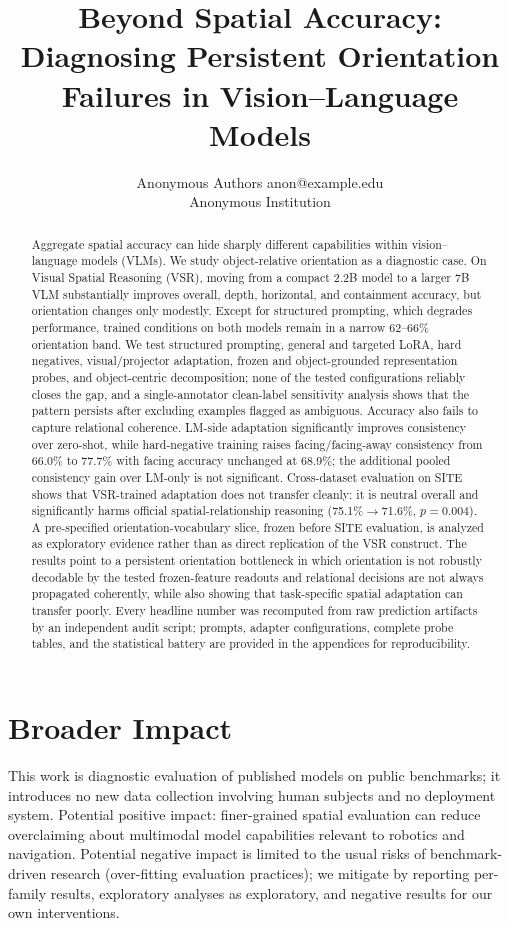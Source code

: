 \documentclass[10pt]{article}
\title{Beyond Spatial Accuracy: Diagnosing Persistent Orientation Failures in Vision--Language Models}
\author{\name Anonymous Authors \email anon@example.edu \\
      \addr Anonymous Institution}
\begin{document}
\maketitle

\begin{abstract}
Aggregate spatial accuracy can hide sharply different capabilities within vision--language models (VLMs). We study object-relative orientation as a diagnostic case. On Visual Spatial Reasoning (VSR), moving from a compact 2.2B model to a larger 7B VLM substantially improves overall, depth, horizontal, and containment accuracy, but orientation changes only modestly. Except for structured prompting, which degrades performance, trained conditions on both models remain in a narrow 62--66\% orientation band. We test structured prompting, general and targeted LoRA, hard negatives, visual/projector adaptation, frozen and object-grounded representation probes, and object-centric decomposition; none of the tested configurations reliably closes the gap, and a single-annotator clean-label sensitivity analysis shows that the pattern persists after excluding examples flagged as ambiguous.
Accuracy also fails to capture relational coherence. LM-side adaptation significantly improves consistency over zero-shot, while hard-negative training raises facing/facing-away consistency from 66.0\% to 77.7\% with facing accuracy unchanged at 68.9\%; the additional pooled consistency gain over LM-only is not significant. Cross-dataset evaluation on SITE shows that VSR-trained adaptation does not transfer cleanly: it is neutral overall and significantly harms official spatial-relationship reasoning (75.1\%$\rightarrow$71.6\%, $p=0.004$). A pre-specified orientation-vocabulary slice, frozen before SITE evaluation, is analyzed as exploratory evidence rather than as direct replication of the VSR construct. The results point to a persistent orientation bottleneck in which orientation is not robustly decodable by the tested frozen-feature readouts and relational decisions are not always propagated coherently, while also showing that task-specific spatial adaptation can transfer poorly. Every headline number was recomputed from raw prediction artifacts by an independent audit script; prompts, adapter configurations, complete probe tables, and the statistical battery are provided in the appendices for reproducibility.
\end{abstract}



\section{Broader Impact}
This work is diagnostic evaluation of published models on public benchmarks; it introduces no new data collection involving human subjects and no deployment system. Potential positive impact: finer-grained spatial evaluation can reduce overclaiming about multimodal model capabilities relevant to robotics and navigation. Potential negative impact is limited to the usual risks of benchmark-driven research (over-fitting evaluation practices); we mitigate by reporting per-family results, exploratory analyses as exploratory, and negative results for our own interventions.




\appendix

\end{document}
